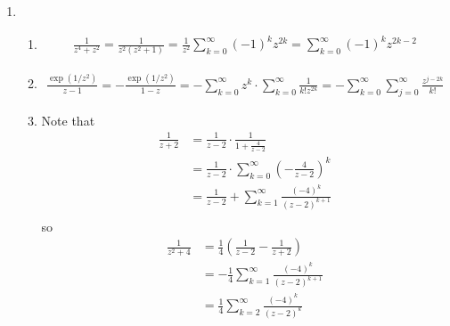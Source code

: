 \documentclass[11pt, letterpaper]{article}
\begin{document}
\begin{enumerate}
  \item \begin{enumerate}
    \item \begin{align*}
      \frac{1}{z^4 + z^2} = \frac{1}{z^2(z^2 + 1)} = \frac{1}{z^2}\sum_{k = 0}^\infty (-1)^k z^{2k} = \sum_{k = 0}^\infty (-1)^k z^{2k - 2}
    \end{align*}
    \item \begin{align*}
      \frac{\exp(1/z^2)}{z - 1} = - \frac{\exp(1/z^2)}{1 - z} = - \sum_{k = 0}^\infty z^k \cdot \sum_{k = 0}^\infty \frac{1}{k!z^{2k}}
      = - \sum_{k = 0}^\infty \sum_{j = 0}^\infty \frac{z^{j - 2k}}{k!}
    \end{align*}
    \item Note that \begin{align*}
      \frac{1}{z + 2}
      &= \frac{1}{z - 2} \cdot \frac{1}{1 + \frac{4}{z - 2}} \\
      &= \frac{1}{z - 2} \cdot \sum_{k = 0}^\infty \left(-\frac{4}{z - 2}\right)^k \\
      &= \frac{1}{z - 2} + \sum_{k = 1}^\infty \frac{(-4)^k}{(z - 2)^{k + 1}} \\
    \end{align*}
    so
    \begin{align*}
      \frac{1}{z^2 + 4}
      &= \frac{1}{4} \left( \frac{1}{z - 2} - \frac{1}{z + 2}\right) \\
      &= -\frac{1}{4} \sum_{k = 1}^\infty \frac{(-4)^k}{(z - 2)^{k + 1}} \\
      &= \frac{1}{4} \sum_{k = 2}^\infty \frac{(-4)^k}{(z - 2)^{k}} \\
    \end{align*}
  \end{enumerate}
\end{enumerate}
\end{document}
